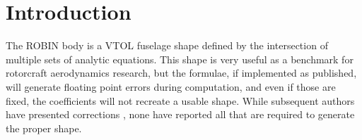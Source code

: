 \documentclass[journal]{new-aiaa}
\begin{document}
\section{Introduction}
The ROBIN body is a VTOL fuselage shape \cite{nasa80051,nasa87762,mineckgorton,nasa1999}
defined by the intersection of multiple sets of analytic equations.
This shape is very useful as a benchmark for rotorcraft aerodynamics research,
but the formulae, if implemented as published,
will generate floating point errors during computation,
and even if those are fixed, the coefficients will not recreate a usable shape.
While subsequent authors have presented corrections \cite{nasa87762,mineckgorton},
none have reported all that are required to generate the proper shape.
\end{document}
